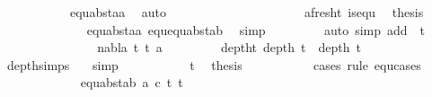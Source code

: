 \begin{isabellebody}
\ \ \ \ \ \ \ \ \ \ \ equ{\isacharunderscore}{\kern0pt}abst{\isacharunderscore}{\kern0pt}aa{\isacharparenleft}{\kern0pt}{}{\isacharparenright}{\kern0pt}\ \isamarkupfalse%
\ auto\isanewline
\ \ \ \ \ \ \ \ \ \ \isanewline
\ \ \ \ \ \ \ \ \ \isamarkupfalse%
\ a{\isacharunderscore}{\kern0pt}fresh{\isacharunderscore}{\kern0pt}t{}\ is{\isacharunderscore}{\kern0pt}equ\ \isamarkupfalse%
\ {\isacharquery}{\kern0pt}thesis\isanewline
\ \ \ \ \ \ \ \ \ \ \ \isamarkupfalse%
\ {}\ equ{\isacharunderscore}{\kern0pt}abst{\isacharunderscore}{\kern0pt}aa{\isacharparenleft}{\kern0pt}{}{\isacharcomma}{\kern0pt}{}{\isacharparenright}{\kern0pt}\ equ{\isachardot}{\kern0pt}equ{\isacharunderscore}{\kern0pt}abst{\isacharunderscore}{\kern0pt}ab\ \isamarkupfalse%
\ simp\isanewline
\ \ \ \ \ \ \ \isamarkupfalse%
\ {\isacharparenleft}{\kern0pt}auto\ simp\ add{\isacharcolon}{\kern0pt}\ {}\ t{}{}{\isacharparenright}{\kern0pt}\isanewline
\ \ \ \ \ \isamarkupfalse%
\isanewline
\ \ \ \ \ \ \ \isamarkupfalse%
\ {\isacharparenleft}{\kern0pt}{}\ nabla\ t{}{\isacharprime}{\kern0pt}\ t{}{\isacharprime}{\kern0pt}\ a{\isacharparenright}{\kern0pt}\isanewline
\ \ \ \ \ \ \ \isamarkupfalse%
\ deptht{}{\isacharcolon}{\kern0pt}\ {\isachardoublequoteopen}depth\ t{}{\isacharprime}{\kern0pt}\ {\isacharless}{\kern0pt}\ depth\ t{}{\isachardoublequoteclose}\isanewline
\ \ \ \ \ \ \ \ \ \isamarkupfalse%
\ depth{\isachardot}{\kern0pt}simps{\isacharparenleft}{\kern0pt}{}{\isacharparenright}{\kern0pt}\ {}{\isacharparenleft}{\kern0pt}{}{\isacharparenright}{\kern0pt}\ \isamarkupfalse%
\ simp\isanewline
\ \ \ \ \ \ \ \ \ \isamarkupfalse%
\ t{}{}\ \isamarkupfalse%
\ {\isacharquery}{\kern0pt}thesis\ \isanewline
\ \ \ \ \ \ \ \ \ \isamarkupfalse%
{\isacharparenleft}{\kern0pt}cases\ rule{\isacharcolon}{\kern0pt}\ equ{\isachardot}{\kern0pt}cases{\isacharparenright}{\kern0pt}\isanewline
\ \ \ \ \ \ \ \ \ \ \ \isamarkupfalse%
\ {\isacharparenleft}{\kern0pt}equ{\isacharunderscore}{\kern0pt}abst{\isacharunderscore}{\kern0pt}ab\ a\ c\ t{}{\isacharprime}{\kern0pt}\ t{}{\isacharprime}{\kern0pt}{\isacharparenright}{\kern0pt}\isanewline

\end{isabellebody}
